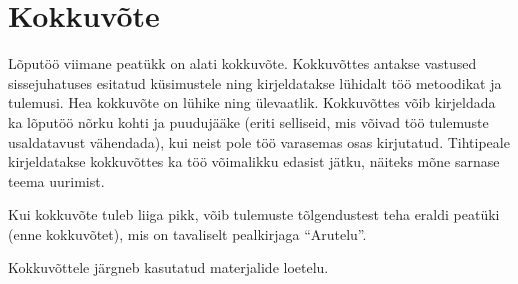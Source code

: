 \section*{Kokkuvõte}

Lõputöö viimane peatükk on alati kokkuvõte.
Kokkuvõttes antakse vastused sissejuhatuses esitatud küsimustele ning kirjeldatakse lühidalt töö metoodikat ja tulemusi.
Hea kokkuvõte on lühike ning ülevaatlik.
Kokkuvõttes võib kirjeldada ka lõputöö nõrku kohti ja puudujääke (eriti selliseid, mis võivad töö tulemuste usaldatavust vähendada), kui neist pole töö varasemas osas kirjutatud.
Tihtipeale kirjeldatakse kokkuvõttes ka töö võimalikku edasist jätku, näiteks mõne sarnase teema uurimist.

Kui kokkuvõte tuleb liiga pikk, võib tulemuste tõlgendustest teha eraldi peatüki (enne kokkuvõtet), mis on tavaliselt pealkirjaga "`Arutelu"'.

Kokkuvõttele järgneb kasutatud materjalide loetelu.